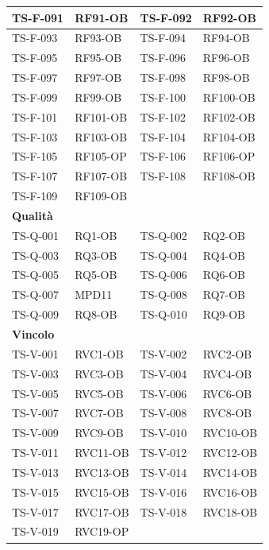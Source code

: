 \documentclass[a4paper,12pt]{article}
\begin{document}
{\begin{longtable}{|p{2.5cm}|p{2.2cm}|p{2.5cm}|p{2.2cm}|}
    \hline
    TS-F-091 & RF91-OB & TS-F-092 & RF92-OB \\
    \hline
    TS-F-093 & RF93-OB & TS-F-094 & RF94-OB \\
    \hline
    TS-F-095 & RF95-OB & TS-F-096 & RF96-OB \\
    \hline
    TS-F-097 & RF97-OB & TS-F-098 & RF98-OB \\
    \hline
    TS-F-099 & RF99-OB & TS-F-100 & RF100-OB \\
    \hline
    TS-F-101 & RF101-OB & TS-F-102 & RF102-OB \\
    \hline
    TS-F-103 & RF103-OB & TS-F-104 & RF104-OB \\
    \hline
    TS-F-105 & RF105-OP & TS-F-106 & RF106-OP \\
    \hline
    TS-F-107 & RF107-OB & TS-F-108 & RF108-OB \\
    \hline
    TS-F-109 & RF109-OB & & \\
    \hline
    \multicolumn{4}{|l|}{\cellcolor{gray!12}\textbf{Qualità}} \\
    \hline
    TS-Q-001 & RQ1-OB & TS-Q-002 & RQ2-OB \\
    \hline
    TS-Q-003 & RQ3-OB & TS-Q-004 & RQ4-OB \\
    \hline
    TS-Q-005 & RQ5-OB & TS-Q-006 & RQ6-OB \\
    \hline
    TS-Q-007 & MPD11  & TS-Q-008 & RQ7-OB \\
    \hline
    TS-Q-009 & RQ8-OB  & TS-Q-010 & RQ9-OB \\
    \hline
    \multicolumn{4}{|l|}{\cellcolor{gray!12}\textbf{Vincolo}} \\
    \hline
    TS-V-001 & RVC1-OB & TS-V-002 & RVC2-OB \\
    \hline
    TS-V-003 & RVC3-OB & TS-V-004 & RVC4-OB \\
    \hline
    TS-V-005 & RVC5-OB & TS-V-006 & RVC6-OB \\
    \hline
    TS-V-007 & RVC7-OB & TS-V-008 & RVC8-OB \\
    \hline
    TS-V-009 & RVC9-OB & TS-V-010 & RVC10-OB \\
    \hline
    TS-V-011 & RVC11-OB & TS-V-012 & RVC12-OB \\
    \hline
    TS-V-013 & RVC13-OB & TS-V-014 & RVC14-OB \\
    \hline
    TS-V-015 & RVC15-OB & TS-V-016 & RVC16-OB \\
    \hline
    TS-V-017 & RVC17-OB & TS-V-018 & RVC18-OB \\
    \hline
    TS-V-019 & RVC19-OP & & \\
    \hline
\end{longtable}
}
\end{document}
